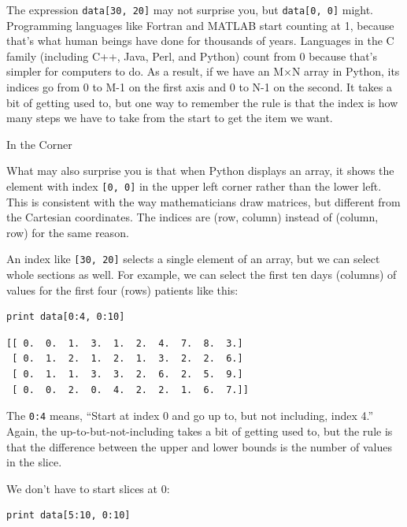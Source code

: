 \documentclass{book}
\begin{document}
The expression \texttt{data{[}30, 20{]}} may not surprise you, but
\texttt{data{[}0, 0{]}} might. Programming languages like Fortran and
MATLAB start counting at 1, because that's what human beings have done
for thousands of years. Languages in the C family (including C++, Java,
Perl, and Python) count from 0 because that's simpler for computers to
do. As a result, if we have an M×N array in Python, its indices go from
0 to M-1 on the first axis and 0 to N-1 on the second. It takes a bit of
getting used to, but one way to remember the rule is that the index is
how many steps we have to take from the start to get the item we want.

\begin{swcbox}{In the Corner}

What may also surprise you is that when Python displays an array, it
shows the element with index \texttt{{[}0, 0{]}} in the upper left
corner rather than the lower left. This is consistent with the way
mathematicians draw matrices, but different from the Cartesian
coordinates. The indices are (row, column) instead of (column, row) for
the same reason.

\end{swcbox}

An index like \texttt{{[}30, 20{]}} selects a single element of an
array, but we can select whole sections as well. For example, we can
select the first ten days (columns) of values for the first four (rows)
patients like this:

\begin{verbatim}
print data[0:4, 0:10]
\end{verbatim}

\begin{verbatim}
[[ 0.  0.  1.  3.  1.  2.  4.  7.  8.  3.]
 [ 0.  1.  2.  1.  2.  1.  3.  2.  2.  6.]
 [ 0.  1.  1.  3.  3.  2.  6.  2.  5.  9.]
 [ 0.  0.  2.  0.  4.  2.  2.  1.  6.  7.]]
\end{verbatim}

The  \texttt{0:4} means, ``Start at index 0 and
go up to, but not including, index 4.'' Again, the
up-to-but-not-including takes a bit of getting used to, but the rule is
that the difference between the upper and lower bounds is the number of
values in the slice.

We don't have to start slices at 0:

\begin{verbatim}
print data[5:10, 0:10]
\end{verbatim}
\end{document}
